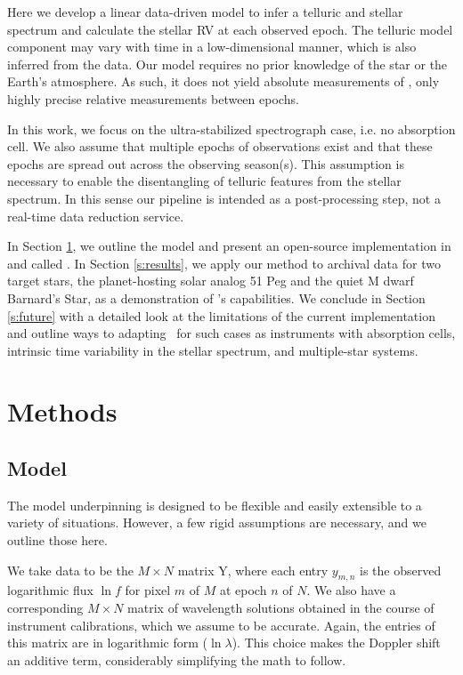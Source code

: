 \documentclass[modern]{aastex62}
\newcommand{\Mdwarf}{Barnard's Star}
\begin{document}
Here we develop a linear data-driven model to infer a telluric and stellar spectrum and calculate the stellar RV at each observed epoch. 
The telluric model component may vary with time in a low-dimensional manner, which is also inferred from the data. 
Our model requires no prior knowledge of the star or the Earth's atmosphere. 
As such, it does not yield absolute measurements of \RVs, only highly precise relative measurements between epochs.

In this work, we focus on the ultra-stabilized spectrograph case, i.e. no absorption cell. 
We also assume that multiple epochs of observations exist and that these epochs are spread out across the observing season(s). 
This assumption is necessary to enable the disentangling of telluric features from the stellar spectrum. 
In this sense our pipeline is intended as a post-processing step, not a real-time data reduction service. 

In Section \ref{s:methods}, we outline the model and present an open-source implementation in \python and \TF called \wobble. 
In Section \ref{s:results}, we apply our method to \HARPS archival data for two target stars, the planet-hosting solar analog 51 Peg and the quiet M dwarf \Mdwarf, as a demonstration of \wobble's capabilities. 
We conclude in Section \ref{s:future} with a detailed look at the limitations of the current implementation and outline ways to adapting \wobble\ for such cases as instruments with absorption cells, intrinsic time variability in the stellar spectrum, and multiple-star systems.

\section{Methods}
\label{s:methods}
\subsection{Model}

The model underpinning \wobble is designed to be flexible and easily extensible to a variety of situations. 
However, a few rigid assumptions are necessary, and we outline those here.

We take data to be the $M \times N$ matrix Y, where each entry $y_{m,n}$ is the observed logarithmic flux $\ln f$ for pixel $m$ of $M$ at epoch $n$ of $N$. 
We also have a corresponding $M \times N$ matrix of wavelength solutions obtained in the course of instrument calibrations, which we assume to be accurate.
Again, the entries of this matrix are in logarithmic form ($\ln \lambda$). 
This choice makes the Doppler shift an additive term, considerably simplifying the math to follow.
\end{document}
